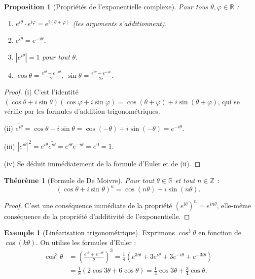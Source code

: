 \documentclass[12pt,a4paper,openany]{book}
\theoremstyle{definition}
\newtheorem{exemple}[definition]{Exemple}
\theoremstyle{plain}
\newtheorem{theoreme}[definition]{Théorème}
\newtheorem{proposition}[definition]{Proposition}
\theoremstyle{remark}
\newcommand{\R}{\mathbb{R}}
\newcommand{\Z}{\mathbb{Z}}
\newcommand{\abs}[1]{\left|#1\right|}
\newcommand{\conj}[1]{\overline{#1}}
\begin{document}
\begin{proposition}[Propriétés de l'exponentielle complexe]\label{prop:exp-proprietes}
Pour tous $\theta, \varphi \in \R$ :
\begin{enumerate}[label=(\roman*)]
  \item $e^{i\theta} \cdot e^{i\varphi} = e^{i(\theta + \varphi)}$ \quad (les arguments s'additionnent).
  \item $\conj{e^{i\theta}} = e^{-i\theta}$.
  \item $\abs{e^{i\theta}} = 1$ pour tout $\theta$.
  \item $\cos\theta = \frac{e^{i\theta} + e^{-i\theta}}{2}$, \quad $\sin\theta = \frac{e^{i\theta} - e^{-i\theta}}{2i}$.
\end{enumerate}
\end{proposition}

\begin{proof}
(i) C'est l'identité $(\cos\theta + i\sin\theta)(\cos\varphi + i\sin\varphi) = \cos(\theta+\varphi) + i\sin(\theta+\varphi)$, qui se vérifie par les formules d'addition trigonométriques.

(ii) $\conj{e^{i\theta}} = \cos\theta - i\sin\theta = \cos(-\theta) + i\sin(-\theta) = e^{-i\theta}$.

(iii) $\abs{e^{i\theta}}^2 = e^{i\theta}\conj{e^{i\theta}} = e^{i\theta}e^{-i\theta} = e^0 = 1$.

(iv) Se déduit immédiatement de la formule d'Euler et de (ii).
\end{proof}

\begin{theoreme}[Formule de De Moivre]\label{thm:de-moivre}
Pour tout $\theta \in \R$ et tout $n \in \Z$ :
\[
  (\cos\theta + i\sin\theta)^n = \cos(n\theta) + i\sin(n\theta).
\]
\end{theoreme}

\begin{proof}
C'est une conséquence immédiate de la propriété $(e^{i\theta})^n = e^{in\theta}$, elle-même conséquence de la propriété d'additivité de l'exponentielle.
\end{proof}

\begin{exemple}[Linéarisation trigonométrique]\label{ex:linearisation}
Exprimons $\cos^3\theta$ en fonction de $\cos(k\theta)$. On utilise les formules d'Euler :
\begin{align*}
  \cos^3\theta &= \left(\frac{e^{i\theta}+e^{-i\theta}}{2}\right)^3 = \frac{1}{8}\left(e^{3i\theta} + 3e^{i\theta} + 3e^{-i\theta} + e^{-3i\theta}\right) \\
  &= \frac{1}{8}\left(2\cos 3\theta + 6\cos\theta\right) = \frac{1}{4}\cos 3\theta + \frac{3}{4}\cos\theta.
\end{align*}
\end{exemple}
\end{document}
